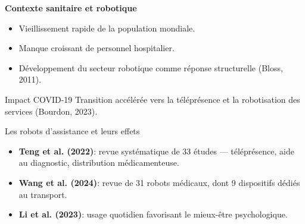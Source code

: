 \documentclass[10pt,aspectratio=169]{beamer}
\begin{document}
\begin{frame}{\textbf{Contexte sanitaire et robotique}}

\begin{itemize}
    \item Vieillissement rapide de la population mondiale.
    \item Manque croissant de personnel hospitalier.
    \item Développement du secteur robotique comme réponse structurelle (Bloss, 2011).
\end{itemize}

\vspace{0.3cm}

\begin{block}{Impact COVID-19}
Transition accélérée vers la téléprésence et la robotisation des services (Bourdon, 2023).
\end{block}

\end{frame}
\begin{frame}{Les robots d’assistance et leurs effets}

\begin{itemize}
    \item \textbf{Teng et al. (2022)}:
    revue systématique de 33 études —
    téléprésence, aide au diagnostic, distribution médicamenteuse.
    
    \item \textbf{Wang et al. (2024)}:
    revue de 31 robots médicaux,
    dont 9 dispositifs dédiés au transport.
    
    \item \textbf{Li et al. (2023)}:
    usage quotidien favorisant le mieux-être psychologique.
\end{itemize}

\end{frame}
\end{document}
